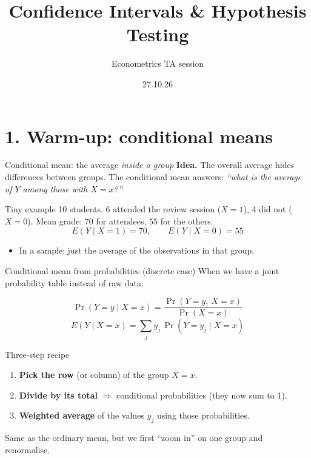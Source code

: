 \documentclass[
  11pt,
  ignorenonframetext,
  aspectratio=169,
]{beamer}
\title{\texorpdfstring{Confidence Intervals \& Hypothesis
Testing}{Confidence Intervals \& Hypothesis Testing}}
\subtitle{\texorpdfstring{Econometrics TA session}{Econometrics, TA session}}
\author{27.10.26}
\date{}
\providecommand{\tightlist}{%
  \setlength{\itemsep}{0pt}\setlength{\parskip}{0pt}}
\begin{document}
\frame{\titlepage}



\section{1. Warm-up: conditional means}\label{warm-up-conditional-means}

\begin{frame}{Conditional mean: the average \emph{inside a group}}
\protect{}\label{conditional-mean-the-average-inside-a-group}
\textbf{Idea.} The overall average hides differences between groups. The
conditional mean answers: \emph{``what is the average of \(Y\) among
those with \(X=x\)?''}

\begin{block}{Tiny example}
\protect{}\label{tiny-example}
10 students. 6 attended the review session (\(X=1\)), 4 did not
(\(X=0\)). Mean grade: \(70\) for attendees, \(55\) for the others.
\[E(Y\mid X=1)=70,\qquad E(Y\mid X=0)=55\]
\end{block}

\begin{itemize}
\tightlist
\item
  In a sample: just the average of the observations in that group.
\end{itemize}
\end{frame}

\begin{frame}{Conditional mean from probabilities (discrete case)}
\protect{}\label{conditional-mean-from-probabilities-discrete-case}
When we have a joint probability table instead of raw data:

\[\Pr(Y=y\mid X=x)=\frac{\Pr(Y=y,\ X=x)}{\Pr(X=x)}\]
\[E(Y\mid X=x)=\sum_{j} y_j \,\Pr(Y=y_j\mid X=x)\]

\begin{block}{Three-step recipe}
\protect{}\label{three-step-recipe}
\begin{enumerate}
\tightlist
\item
  \textbf{Pick the row} (or column) of the group \(X=x\).
\item
  \textbf{Divide by its total} \(\Rightarrow\) conditional probabilities
  (they now sum to 1).
\item
  \textbf{Weighted average} of the values \(y_j\) using those
  probabilities.
\end{enumerate}
\end{block}

Same as the ordinary mean, but we first ``zoom in'' on one group and
renormalise.
\end{frame}
\end{document}

